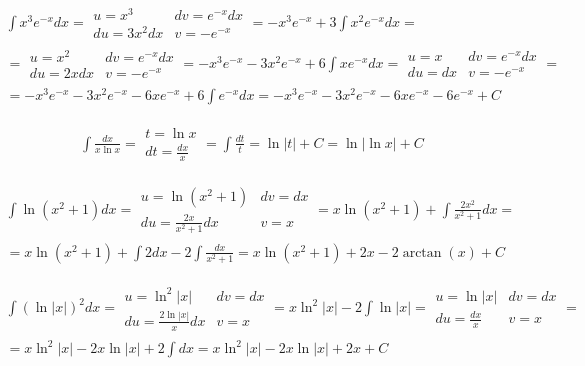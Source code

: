 
\begin{gather*}\int x^3e^{-x}dx = \begin{array}{|ll|}
u=x^3 & dv=e^{-x}dx \\
du=3x^2dx & v=-e^{-x}
\end{array} = -x^3e^{-x}+3\int x^2e^{-x}dx = \\ = \begin{array}{|ll|}
u=x^2 & dv=e^{-x}dx \\
du=2xdx & v=-e^{-x}
\end{array} = -x^3e^{-x}-3x^2e^{-x}+6\int xe^{-x}dx = \begin{array}{|ll|}
u=x & dv=e^{-x}dx \\
du=dx & v=-e^{-x}
\end{array} = \\ = -x^3e^{-x}-3x^2e^{-x}-6xe^{-x}+6\int e^{-x}dx = -x^3e^{-x}-3x^2e^{-x}-6xe^{-x}-6e^{-x}+C\end{gather*}



\begin{gather*}\int \frac{dx}{x\ln x} = \begin{array}{|l|} t=\ln x \\ dt=\frac{dx}{x} \end{array} = \int \frac{dt}{t} = \ln|t|+C = \ln|\ln x|+C\end{gather*}



\begin{gather*}\int \ln(x^2+1)dx = \begin{array}{|ll|}
u=\ln(x^2+1) & dv=dx \\
du=\frac{2x}{x^2+1}dx & v=x \end{array} = x\ln(x^2+1)+\int \frac{2x^2}{x^2+1}dx = \\ = x\ln(x^2+1)+\int 2dx-2\int \frac{dx}{x^2+1} = x\ln(x^2+1)+2x-2\arctan(x)+C\end{gather*}



\begin{gather*}\int (\ln|x|)^2 dx = \begin{array}{|ll|}
u=\ln^2|x| & dv=dx \\
du=\frac{2\ln|x|}{x}dx & v=x \end{array} = x\ln^2|x|-2\int \ln|x| = \begin{array}{|ll|}
u=\ln|x| & dv=dx \\
du=\frac{dx}{x} & v=x \end{array} = \\ = x\ln^2|x|-2x\ln|x|+2\int dx = x\ln^2|x|-2x\ln|x|+2x+C\end{gather*}


